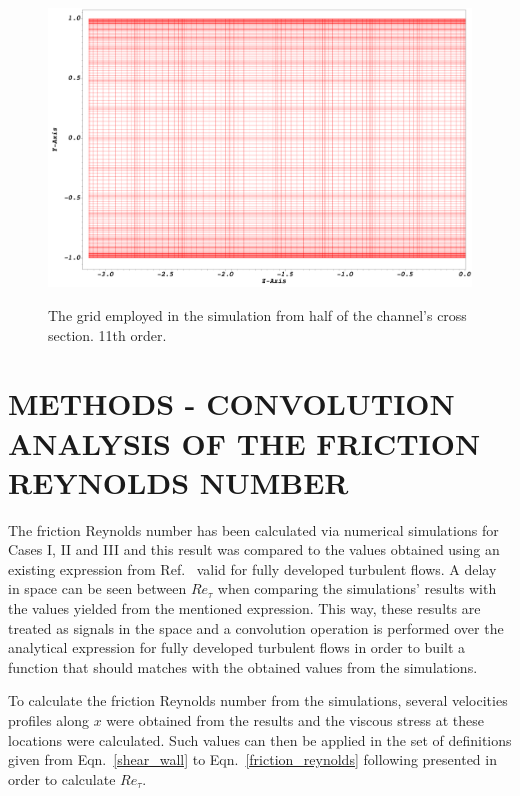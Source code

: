 \documentclass[twocolumn,10pt]{asme2e}
\begin{document}
\begin{figure}[t]
	\centering
	\scalebox{0.16}
	{\includegraphics{mesh.png}}
	\caption{The grid employed in the simulation from half of the channel's cross section. 11th order.}
	\label{fig:mesh}
\end{figure}


\section*{METHODS - CONVOLUTION ANALYSIS OF THE FRICTION REYNOLDS NUMBER}

The friction Reynolds number has been calculated via numerical simulations for Cases I, II and III and this result was compared to the values obtained using an existing expression from Ref.~\cite{pope} valid for fully developed turbulent flows. A delay in space can be seen between \(Re_{\tau}\) when comparing the simulations' results with the values yielded from the mentioned expression. This way, these results are treated as signals in the space and a convolution operation is performed over the analytical expression for fully developed turbulent flows in order to built a function that should matches with the obtained values from the simulations.

To calculate the friction Reynolds number from the simulations, several velocities profiles along \(x\) were obtained from the results and the viscous stress at these locations were calculated. Such values can then be applied in the set of definitions given from Eqn.~\ref{shear_wall} to Eqn.~\ref{friction_reynolds} following presented in order to calculate \(Re_{\tau}\).
\end{document}
